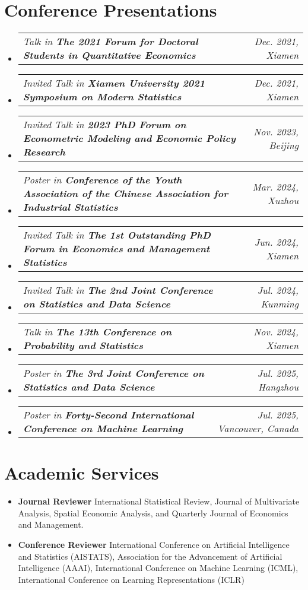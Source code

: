 \documentclass[letterpaper,10pt]{article}
\makeatletter
\newcommand{\resumeSubSubheading}[2]{
    \item
    \begin{tabular*}{0.97\textwidth}{l@{\extracolsep{\fill}}r}
      \textit{\small#1} & \textit{\small #2} \\
    \end{tabular*}\vspace{-7pt}
}
\newcommand{\resumeSubHeadingListStart}{\begin{itemize}[leftmargin=0.15in, label={}]}
\newcommand{\resumeSubHeadingListEnd}{\end{itemize}}
\makeatother
\begin{document}
\section{Conference Presentations}
\resumeSubHeadingListStart
    \resumeSubSubheading
        {Talk in \textbf{The 2021 Forum for Doctoral Students in Quantitative Economics}}{Dec. 2021, Xiamen}
    \resumeSubSubheading
        {Invited Talk in \textbf{Xiamen University 2021 Symposium on Modern Statistics}}{Dec. 2021, Xiamen}
    \resumeSubSubheading
        {Invited Talk in \textbf{2023 PhD Forum on Econometric Modeling and Economic Policy Research}}{Nov. 2023, Beijing}
    \resumeSubSubheading
        {Poster in \textbf{Conference of the Youth Association of the Chinese Association for Industrial Statistics}}{Mar. 2024, Xuzhou}
    \resumeSubSubheading
        {Invited Talk in \textbf{The 1st Outstanding PhD Forum in Economics and Management Statistics}}{Jun. 2024, Xiamen}
    \resumeSubSubheading
        {Invited Talk in \textbf{The 2nd Joint Conference on Statistics and Data Science}}{Jul. 2024, Kunming}
    \resumeSubSubheading
        {Talk in \textbf{The 13th Conference on Probability and Statistics}}{Nov. 2024, Xiamen}
    \resumeSubSubheading
        {Poster in \textbf{The 3rd Joint Conference on Statistics and Data Science}}{Jul. 2025, Hangzhou}
    \resumeSubSubheading
        {Poster in \textbf{Forty-Second International Conference on Machine Learning}}{Jul. 2025, Vancouver, Canada}
\resumeSubHeadingListEnd


\section{Academic Services}
\begin{itemize}[leftmargin=0.15in, label={}]
   \item \textbf{Journal Reviewer} 
 {International Statistical Review}, {Journal of Multivariate Analysis}, {Spatial Economic Analysis}, and {Quarterly Journal of Economics and Management}.\\
  \item \textbf{Conference Reviewer} 
 {International Conference on Artificial Intelligence and Statistics (AISTATS), Association for the Advancement of Artificial Intelligence (AAAI), International Conference on Machine Learning (ICML), International Conference on Learning Representations (ICLR)}
\end{itemize}
\end{document}
